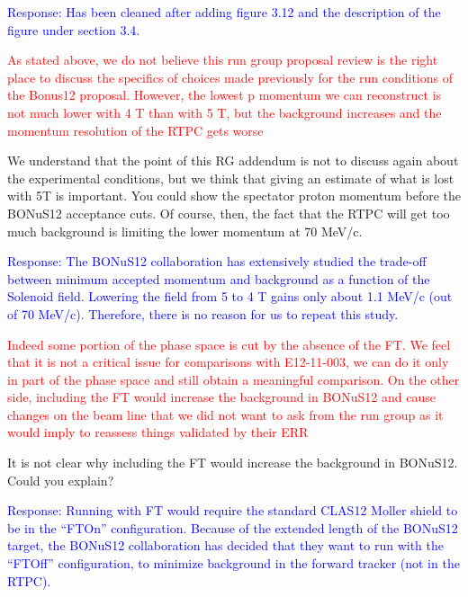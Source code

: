 \begin{itemize}
  \textcolor{blue}{Response: Has been cleaned after adding figure 3.12 and the 
       description of the figure under section 3.4. }
  
       
 \textcolor{red}{
 \item As stated above, we do not believe this run group proposal review is the 
    right place to discuss the specifics of choices made previously for the run 
       conditions of the Bonus12 proposal. However, the lowest p momentum we 
       can reconstruct is not much lower with 4 T than with 5 T, but the 
       background increases and the momentum resolution of the RTPC gets worse}
\newline

We understand that the point of this RG addendum is not to discuss again about 
       the experimental conditions, but we think that giving an estimate of 
       what is lost with 5T is important. You could show the spectator proton 
       momentum before the BONuS12 acceptance cuts. Of course, then, the fact 
       that the RTPC will get too much background is limiting the lower 
       momentum at 70 MeV/c.

  
       \textcolor{blue}{Response: The BONuS12 collaboration has extensively 
       studied the trade-off between minimum accepted momentum and background 
       as a function of the Solenoid field. Lowering the field from 5 to 4 T 
       gains only about 1.1 MeV/c (out of 70 MeV/c). Therefore, there is no 
       reason for us to repeat this study. }

\textcolor{red}{
\item Indeed some portion of the phase space is cut by the absence of the FT. 
   We feel that it is not a critical issue
for comparisons with E12-11-003, we can do it only in part of the phase space and still
obtain a meaningful comparison. On the other side, including the FT would increase
the background in BONuS12 and cause changes on the beam line that we did not want
to ask from the run group as it would imply to reassess things validated by their ERR
}
 \newline

It is not clear why including the FT would increase the background in BONuS12.  
Could you explain?
  
  \textcolor{blue}{Response: Running with FT would require the standard CLAS12 
  Moller shield to be in the ``FTOn'' configuration. Because of the extended 
  length of the BONuS12 target, the BONuS12 collaboration has decided that they 
  want to run with the ``FTOff'' configuration, to minimize background in the 
  forward tracker (not in the RTPC).}
 




\end{itemize}
